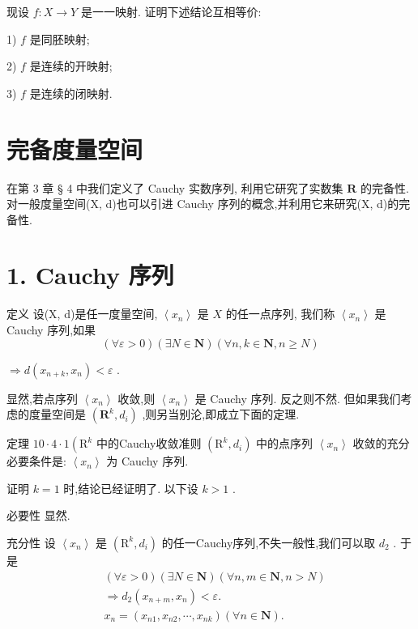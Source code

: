 现设 $f : X \rightarrow  Y$ 是一一映射. 证明下述结论互相等价:

1) $f$ 是同胚映射;

2) $f$ 是连续的开映射;

3) $f$ 是连续的闭映射.

\section{完备度量空间}

在第 3 章 § 4 中我们定义了 Cauchy 实数序列, 利用它研究了实数集 $\mathbf{R}$ 的完备性. 对一般度量空间(X, d)也可以引进 Cauchy 序列的概念,并利用它来研究(X, d)的完备性.

\section*{1. Cauchy 序列}

定义 设(X, d)是任一度量空间, $\left\langle  {x}_{n}\right\rangle$ 是 $X$ 的任一点序列, 我们称 $\left\langle  {x}_{n}\right\rangle$ 是 Cauchy 序列,如果
$$\left( {\forall \varepsilon  > 0}\right) \left( {\exists N \in  \mathbf{N}}\right) \left( {\forall n,k \in  \mathbf{N},n \geq  N}\right)$$

$\Rightarrow  d\left( {{x}_{n + k},{x}_{n}}\right)  < \varepsilon$ .

显然,若点序列 $\left\langle  {x}_{n}\right\rangle$ 收敛,则 $\left\langle  {x}_{n}\right\rangle$ 是 Cauchy 序列. 反之则不然. 但如果我们考虑的度量空间是 $\left( {{\mathbf{R}}^{k},{d}_{i}}\right)$ ,则另当别沦,即成立下面的定理.

定理 ${10} \cdot  4 \cdot  1\left( {\mathrm{R}}^{k}\right.$ 中的Cauchy收敛准则 $\left( {{\mathrm{R}}^{k},{d}_{i}}\right)$ 中的点序列 $\left\langle  {x}_{n}\right\rangle$ 收敛的充分必要条件是: $\left\langle  {x}_{n}\right\rangle$ 为 Cauchy 序列.

证明 $k = 1$ 时,结论已经证明了. 以下设 $k > 1$ .

必要性 显然.

充分性 设 $\left\langle  {x}_{n}\right\rangle$ 是 $\left( {{\mathrm{R}}^{k},{d}_{i}}\right)$ 的任一Cauchy序列,不失一般性,我们可以取 ${d}_{2}$ . 于是
\begin{align*}
	&\left( {\forall \varepsilon  > 0}\right) \left( {\exists N \in  \mathbf{N}}\right) \left( {\forall n,m \in  \mathbf{N},n > N}\right)\\
	&\Rightarrow  {d}_{2}\left( {{x}_{n + m},{x}_{n}}\right)  < \varepsilon .\\
	&{x}_{n} = \left( {{x}_{n1},{x}_{n2},\cdots ,{x}_{nk}}\right) \left( {\forall n \in  \mathbf{N}}\right) .
\end{align*}

